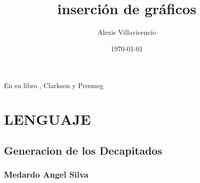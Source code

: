 \documentclass[a4paper,12pt]{article}
\title{inserción de gráficos}
\author{Alexis Villavicencio}
\date{\today}
\begin{document}
\maketitle

En su libro , Clarkson y Presmeg \cite[p45, figura 4.2]{9781441935113}
\tableofcontents
\section{LENGUAJE}
\lipsum
\subsection{Generacion de los Decapitados}
\lipsum
\subsubsection{Medardo Angel Silva}
\lipsum
\nocite{Evans , Goo_1971, JCR, Brezis , Alberty_1999}

\end{document}
